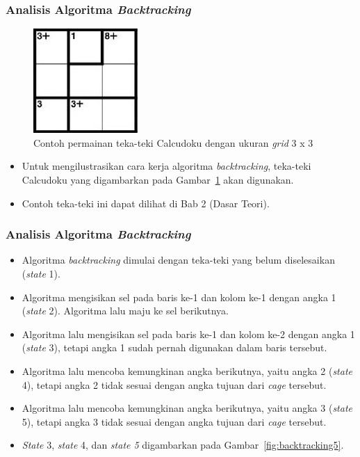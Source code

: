 \documentclass{beamer}
\begin{document}
\begin{frame}
\frametitle{Analisis Algoritma \textit{Backtracking}}
\begin{figure}
\centering
\captionsetup{justification=centering}
\includegraphics[scale=1]{Gambar/Backtracking4}
\caption[Contoh permainan teka-teki Calcudoku dengan ukuran \textit{grid} 3 x 3]{Contoh permainan teka-teki Calcudoku dengan ukuran \textit{grid} 3 x 3}
\label{fig:backtracking4}
\end{figure}
\begin{itemize}
\item Untuk mengilustrasikan cara kerja algoritma \textit{backtracking}, teka-teki Calcudoku yang digambarkan pada Gambar~\ref{fig:backtracking4} akan digunakan.
\item Contoh teka-teki ini dapat dilihat di Bab 2 (Dasar Teori).
\end{itemize}
\end{frame}


\begin{frame}
\frametitle{Analisis Algoritma \textit{Backtracking}}
\begin{itemize}
\item Algoritma \textit{backtracking} dimulai dengan teka-teki yang belum diselesaikan (\textit{state} 1).
\item Algoritma mengisikan sel pada baris ke-1 dan kolom ke-1 dengan angka 1 (\textit{state} 2). Algoritma lalu maju ke sel berikutnya.
\item Algoritma lalu mengisikan sel pada baris ke-1 dan kolom ke-2 dengan angka 1 (\textit{state} 3), tetapi angka 1 sudah pernah digunakan dalam baris tersebut.
\item Algoritma lalu mencoba kemungkinan angka berikutnya, yaitu angka 2 (\textit{state} 4), tetapi angka 2 tidak sesuai dengan angka tujuan dari \textit{cage} tersebut.
\item Algoritma lalu mencoba kemungkinan angka berikutnya, yaitu angka 3 (\textit{state} 5), tetapi angka 3 tidak sesuai dengan angka tujuan dari \textit{cage} tersebut.
\item \textit{State} 3, \textit{state} 4, dan \textit{state 5} digambarkan pada Gambar~\ref{fig:backtracking5}.
\end{itemize}
\end{frame}
\end{document}
